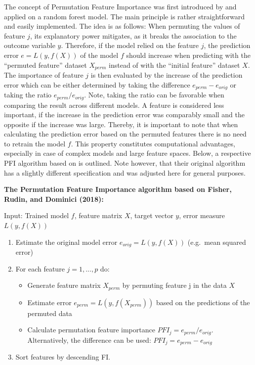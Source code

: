 \documentclass[
]{krantz}
\providecommand{\tightlist}{%
  \setlength{\itemsep}{0pt}\setlength{\parskip}{0pt}}
\begin{document}
The concept of Permutation Feature Importance was first introduced by \citet{breiman2001random} and applied on a random forest model. The main principle is rather straightforward and easily implemented. The idea is as follows: When permuting the values of feature \(j\), its explanatory power mitigates, as it breaks the association to the outcome variable \(y\). Therefore, if the model relied on the feature \(j\), the prediction error \(e = L(y,f(X))\) of the model \(f\) should increase when predicting with the ``permuted feature'' dataset \(X_{perm}\) instead of with the ``initial feature'' dataset \(X\). The importance of feature \(j\) is then evaluated by the increase of the prediction error which can be either determined by taking the difference \(e_{perm} - e_{orig}\) or taking the ratio \(e_{perm}/e_{orig}\). Note, taking the ratio can be favorable when comparing the result across different models. A feature is considered less important, if the increase in the prediction error was comparably small and the opposite if the increase was large. Thereby, it is important to note that when calculating the prediction error based on the permuted features there is no need to retrain the model \(f\). This property constitutes computational advantages, especially in case of complex models and large feature spaces. Below, a respective PFI algorithm based on \citet{fisher2018model} is outlined. Note however, that their original algorithm has a slightly different specification and was adjusted here for general purposes.

\textbf{The Permutation Feature Importance algorithm based on Fisher, Rudin, and Dominici (2018):}

Input: Trained model \(f\), feature matrix \(X\), target vector \(y\), error measure \(L(y,f(X))\)

\begin{enumerate}
\def\labelenumi{\arabic{enumi}.}
\tightlist
\item
  Estimate the original model error \(e_{orig} = L(y,f(X))\) (e.g.~mean squared error)
\item
  For each feature \(j = 1,...,p\) do:

  \begin{itemize}
  \tightlist
  \item
    Generate feature matrix \(X_{perm}\) by permuting feature j in the data \(X\)
  \item
    Estimate error \(e_{perm} = L(y,f(X_{perm}))\) based on the predictions of the permuted data
  \item
    Calculate permutation feature importance \(PFI_{j} = e_{perm}/e_{orig}\). Alternatively, the difference can be used: \(PFI_{j} = e_{perm} - e_{orig}\)
  \end{itemize}
\item
  Sort features by descending FI.
\end{enumerate}
\end{document}
